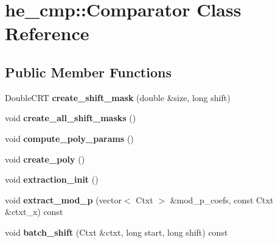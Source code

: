 \hypertarget{classhe__cmp_1_1Comparator}{}\section{he\+\_\+cmp\+:\+:Comparator Class Reference}
\label{classhe__cmp_1_1Comparator}
\subsection*{Public Member Functions}
\begin{DoxyCompactItemize}
\item 
\mbox{\label{classhe__cmp_1_1Comparator_acb2184916720af0f024dbcf6b46bb194}} 
Double\+C\+RT {\bfseries create\+\_\+shift\+\_\+mask} (double \&size, long shift)
\item 
\mbox{\label{classhe__cmp_1_1Comparator_a31302c43bb591fa3e34c74cd7df9f8de}} 
void {\bfseries create\+\_\+all\+\_\+shift\+\_\+masks} ()
\item 
\mbox{\label{classhe__cmp_1_1Comparator_a00456d099469449d849475d1d2906858}} 
void {\bfseries compute\+\_\+poly\+\_\+params} ()
\item 
\mbox{\label{classhe__cmp_1_1Comparator_a3050a54d114bda94c9118b8f5e46c555}} 
void {\bfseries create\+\_\+poly} ()
\item 
\mbox{\label{classhe__cmp_1_1Comparator_a042082f34ca1c974452f887513c00f64}} 
void {\bfseries extraction\+\_\+init} ()
\item 
\mbox{\label{classhe__cmp_1_1Comparator_a9795a678c981e9efdcff37392ac548a9}} 
void {\bfseries extract\+\_\+mod\+\_\+p} (vector$<$ Ctxt $>$ \&mod\+\_\+p\+\_\+coefs, const Ctxt \&ctxt\+\_\+x) const
\item 
\mbox{\label{classhe__cmp_1_1Comparator_a6ffb43438b8af605c8c60221e14266ea}} 
void {\bfseries batch\+\_\+shift} (Ctxt \&ctxt, long start, long shift) const
\item 
\mbox{\label{classhe__cmp_1_1Comparator_a6e3bd9dc1af8155c18af09934d89c6f0}} 

\end{DoxyCompactItemize}
